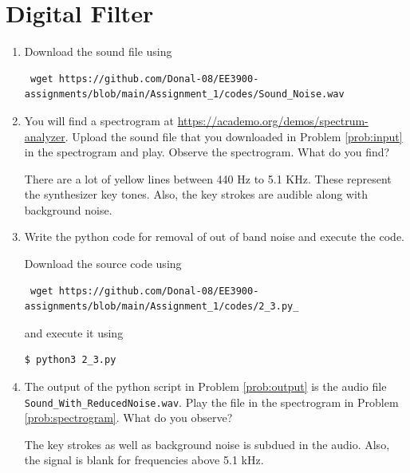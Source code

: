 \documentclass[journal,12pt,twocolumn]{IEEEtran}
\renewcommand\thesection{\arabic{section}}
\begin{document}
\section{Digital Filter}
\begin{enumerate}[label=\thesection.\arabic*
,ref=\thesection.\theenumi]
\item
\label{prob:input}
Download the sound file using
\begin{lstlisting}
 wget https://github.com/Donal-08/EE3900-assignments/blob/main/Assignment_1/codes/Sound_Noise.wav
\end{lstlisting}
\item
\label{prob:spectrogram}
You will find a spectrogram at \href{https://academo.org/demos/spectrum-analyzer}{\url{https://academo.org/demos/spectrum-analyzer}}. Upload the sound file that you downloaded in Problem \ref{prob:input} in the spectrogram and play. Observe the spectrogram. What do you find?

\solution There are a lot of yellow lines between 440 Hz to 5.1 KHz.  These represent the synthesizer key tones. Also, the key strokes
are audible along with background noise.
\item
\label{prob:output}
Write the python code for removal of out of band noise and execute the code.

\solution
Download the source code using
\begin{lstlisting}
 wget https://github.com/Donal-08/EE3900-assignments/blob/main/Assignment_1/codes/2_3.py_
\end{lstlisting}
and execute it using
\begin{lstlisting}
$ python3 2_3.py
\end{lstlisting}
\item
The output of the python script in Problem \ref{prob:output} is the audio file \texttt{Sound\_With\_ReducedNoise.wav}. Play the file in the spectrogram in Problem \ref{prob:spectrogram}. What do you observe?

\solution The key strokes as well as background noise is subdued in the audio. Also, the signal is blank for frequencies above 5.1 kHz.

\end{enumerate}
\end{document}
